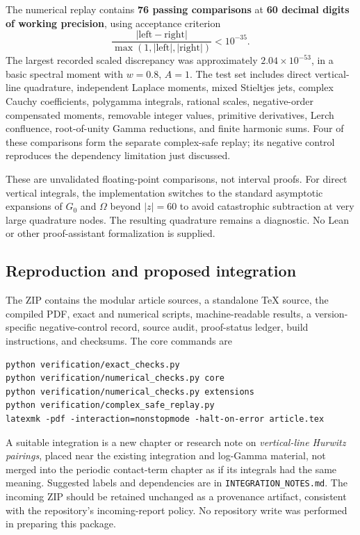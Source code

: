 The numerical replay contains \textbf{76 passing comparisons} at
\textbf{60 decimal digits of working precision}, using acceptance
criterion
\[
 \frac{|\text{left}-\text{right}|}{\max(1,|\text{left}|,|\text{right}|)}
      <10^{-35}.
\]
The largest recorded scaled discrepancy was approximately
$2.04\times10^{-53}$, in a basic spectral moment with $w=0.8$, $A=1$.
The test set includes direct vertical-line quadrature, independent
Laplace moments, mixed Stieltjes jets, complex Cauchy coefficients,
polygamma integrals, rational scales, negative-order compensated
moments, removable integer values, primitive derivatives, Lerch
confluence, root-of-unity Gamma reductions, and finite harmonic sums.
Four of these comparisons form the separate complex-safe replay; its
negative control reproduces the dependency limitation just discussed.

These are unvalidated floating-point comparisons, not interval proofs.
For direct vertical integrals, the implementation switches to the
standard asymptotic expansions of $G_0$ and $\Omega$ beyond $|z|=60$
to avoid catastrophic subtraction at very large quadrature nodes.
The resulting quadrature remains a diagnostic. No Lean or other
proof-assistant formalization is supplied.

\subsection{Reproduction and proposed integration}
The ZIP contains the modular article sources, a standalone TeX source,
the compiled PDF, exact and numerical scripts, machine-readable results,
a version-specific negative-control record, source audit, proof-status
ledger, build instructions, and checksums. The core commands are
\begin{verbatim}
python verification/exact_checks.py
python verification/numerical_checks.py core
python verification/numerical_checks.py extensions
python verification/complex_safe_replay.py
latexmk -pdf -interaction=nonstopmode -halt-on-error article.tex
\end{verbatim}

A suitable integration is a new chapter or research note on
\emph{vertical-line Hurwitz pairings}, placed near the existing integration
and log-Gamma material, not merged into the periodic contact-term chapter
as if its integrals had the same meaning. Suggested labels and dependencies
are in \texttt{INTEGRATION\_NOTES.md}. The incoming ZIP should be retained
unchanged as a provenance artifact, consistent with the repository's
incoming-report policy. No repository write was performed in preparing
this package.

